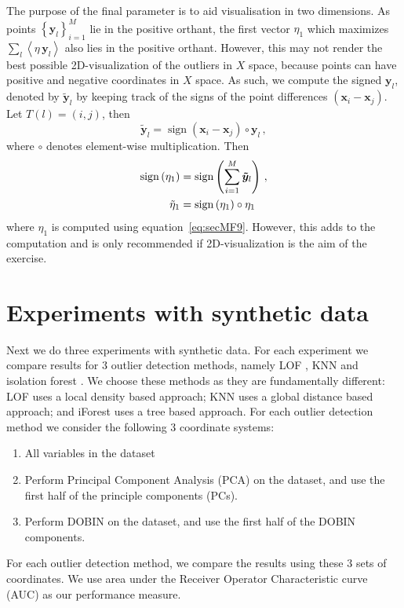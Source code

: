 \documentclass[11pt]{article}
\DeclareMathOperator{\sign}{sign}
\begin{document}
The purpose of the final parameter is to aid visualisation in two dimensions. As points $ \left\{ \bm{y}_{l} \right \}_{i=1}^M$ lie in the positive orthant, the first vector $\eta_1$ which maximizes $\sum_l \left\langle \eta\, \bm{y}_l \right\rangle$ also lies in the positive orthant. However, this may not render the best possible 2D-visualization of the outliers in $X$ space, because points can have positive and negative coordinates in  $X$ space. As such, we compute the signed $\bm{y}_{l}$, denoted by $\bm{\tilde{y}}_l$ by keeping track of the signs of the point differences $\left( \bm{x}_i - \bm{x}_j \right)$. Let $T(l) = \left( i, j \right)$, then 
\begin{equation}\label{eq:secMF16}
    \bm{\tilde{y}}_l = \sign\left( \bm{x}_i - \bm{x}_j \right) \circ \bm{y}_{l}  \, , 
\end{equation}
where $\circ$ denotes element-wise multiplication. Then 
\begin{align}\label{eq:secMF17}
    \sign \left(\eta_1 \right) & = \sign \left( \sum_{i=1}^M  \bm{\tilde{y}}_l \right) \, , \notag \\
    \tilde\eta_1 & = \sign \left(\eta_1 \right) \circ \eta_1 
\end{align}
 where $\eta_1 $ is computed using equation~\eqref{eq:secMF9}. However, this adds to the computation and is only recommended if 2D-visualization is the aim of the exercise. 

\section{Experiments with synthetic data}\label{sec:synthetic}
Next we do three experiments with synthetic data. For each experiment we compare results for $3$ outlier detection methods, namely LOF \citep{breunig2000lof}, KNN \citep{ramaswamy2000efficient} and isolation forest \citep{liu2008isolation}. We choose these methods as they are fundamentally different: LOF uses a local density based approach; KNN uses a global distance based approach; and iForest uses a  tree based approach.  For each outlier detection method we consider the following $3$ coordinate systems:  
\begin{enumerate}  
\item All variables in the dataset
\item Perform Principal Component Analysis (PCA) on the dataset, and use the first half of the principle components (PCs).
\item Perform DOBIN on the dataset, and use the first half of the DOBIN components. 
\end{enumerate}
For each outlier detection method, we compare the results using these $3$ sets of coordinates. We use area under the Receiver Operator Characteristic curve (AUC) as our performance measure. 
\end{document}
